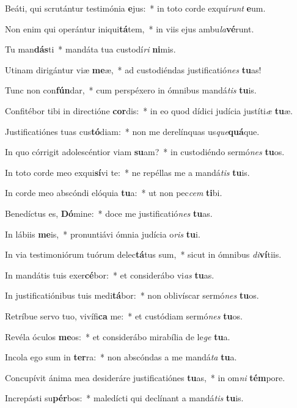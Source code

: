 \item Beáti, qui scrutántur testimónia \textbf{e}jus:~* in toto corde exquí\textit{runt} \textbf{e}um.
\item Non enim qui operántur iniqui\textbf{tá}tem,~* in viis ejus ambu\textit{la}\textbf{vé}runt.
\item Tu man\textbf{dás}ti~* mandáta tua custodí\textit{ri} \textbf{ni}mis.
\item Utinam dirigántur viæ \textbf{me}æ,~* ad custodiéndas justificatió\textit{nes} \textbf{tu}as!
\item Tunc non con\textbf{fún}dar,~* cum perspéxero in ómnibus mandá\textit{tis} \textbf{tu}is.
\item Confitébor tibi in directióne \textbf{cor}dis:~* in eo quod dídici judícia justíti\textit{æ} \textbf{tu}æ.
\item Justificatiónes tuas cus\textbf{tó}diam:~* non me derelínquas us\textit{que}\textbf{quá}que.
\item In quo córrigit adolescéntior viam \textbf{su}am?~* in custodiéndo sermó\textit{nes} \textbf{tu}os.
\item In toto corde meo exqui\textbf{sí}vi te:~* ne repéllas me a mandá\textit{tis} \textbf{tu}is.
\item In corde meo abscóndi elóquia \textbf{tu}a:~* ut non pec\textit{cem} \textbf{ti}bi.
\item Benedíctus es, \textbf{Dó}mine:~* doce me justificatió\textit{nes} \textbf{tu}as.
\item In lábiis \textbf{me}is,~* pronuntiávi ómnia judícia o\textit{ris} \textbf{tu}i.
\item In via testimoniórum tuórum delec\textbf{tá}tus sum,~* sicut in ómnibus \textit{di}\textbf{ví}tiis.
\item In mandátis tuis exer\textbf{cé}bor:~* et considerábo vi\textit{as} \textbf{tu}as.
\item In justificatiónibus tuis medi\textbf{tá}bor:~* non oblivíscar sermó\textit{nes} \textbf{tu}os.
\item Retríbue servo tuo, vivífi\textbf{ca} me:~* et custódiam sermó\textit{nes} \textbf{tu}os.
\item Revéla óculos \textbf{me}os:~* et considerábo mirabília de le\textit{ge} \textbf{tu}a.
\item Incola ego sum in \textbf{ter}ra:~* non abscóndas a me mandá\textit{ta} \textbf{tu}a.
\item Concupívit ánima mea desideráre justificatiónes \textbf{tu}as,~* in om\textit{ni} \textbf{tém}pore.
\item Increpásti su\textbf{pér}bos:~* maledícti qui declínant a mandá\textit{tis} \textbf{tu}is.
